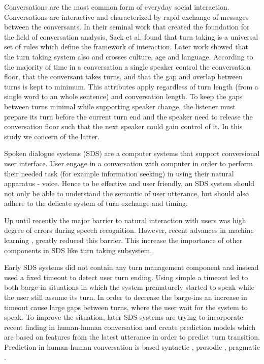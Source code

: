 Conversations are the most common form of everyday social interaction. Conversations are interactive and characterized by rapid exchange of messages between the conversants. 
In their seminal work \cite{sacks1974simplest} that created the foundation for the field of conversation analysis, Sack et al. found that turn taking is a universal
set of rules which define the framework of interaction. Later work showed that the turn taking system also and crosses culture, age and language.  
According to \cite{sacks1974simplest} the majority of time in a conversation a single speaker control the conversation floor, that the conversant takes turns, and that the gap and overlap between turns is kept to minimum. This attributes apply regardless of turn length (from a single word to an whole sentence) and conversation length.
To keep the gaps between turns minimal while supporting speaker change, the listener must prepare its turn before the current turn end and the speaker need to release
the conversation floor such that the next speaker could gain control of it. In this study we concern of the latter.   
   

Spoken dialogue systems (SDS) are a computer systems that support conversional user interface. User engage in a conversation with computer in order to
perform their needed task (for example information seeking) in using their natural apparatus - voice. Hence to be effective and user friendly, an SDS
system should not only be able to understand the semantic of user utterance, but should also adhere to the delicate system of turn exchange and timing.       

Up until recently the major barrier to natural interaction with users was high degree of errors during speech recognition. However, recent advances 
in machine learning , greatly reduced this barrier. This increase the importance of other components in SDS like turn taking subsystem.
         
Early SDS systems did not contain any turn management component and instead used a fixed timeout to detect user turn ending. Using simple a timeout led
to both barge-in situations in which the system prematurely started to speak while the user still assume its turn. In order to decrease the barge-ins
an increase in timeout cause large gaps between turns, where the user wait for the system to speak.
To improve the situation, later SDS systems are trying to incorporate recent finding in human-human conversation and create prediction models which
are based on features from the latest utterance in order to predict turn transition. Prediction in human-human conversation is based syntactic \cite{sacks1974simplest,de2006projecting}, prosodic  \cite{ford1996interactional,stolcke2002speaker,ferrer2003prosody}, pragmatic \cite{ford2001intersection}.


